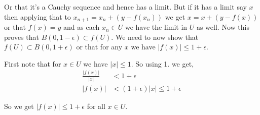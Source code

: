\documentclass[a4paper]{article}
\begin{document}
Or that it's a Cauchy sequence and hence has a limit. But if it has a limit say $x$ then applying that to $x_{n + 1} = x_n + (y - f(x_n))$ we get $x = x + (y - f(x))$ or that $f(x) = y$ and as each $x_n \in U$ we have the limit in $U$ as well. Now this proves that $B(0, 1 - \epsilon) \subset f(U)$. We need to now show that $f(U) \subset B(0, 1 + \epsilon)$ or that for any $x$ we have $|f(x)| \le 1 + \epsilon$. 

\vspace{1em}

First note that for $x \in U$ we have $|x| \le 1$. So using 1. we get, 
\begin{align*}
    \frac{|f(x)|}{|x|} &< 1 + \epsilon\\
    |f(x)| &< (1 + \epsilon)|x| \le  1 + \epsilon
\end{align*}

So we get $|f(x)| \le 1 + \epsilon$ for all $x \in U$. 
\end{document}
